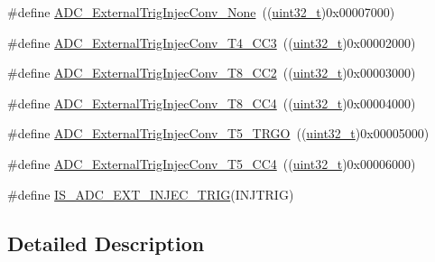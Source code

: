 \begin{DoxyCompactItemize}
\item 
\#define \hyperlink{group___a_d_c__external__trigger__sources__for__injected__channels__conversion_gaad11a68fca76d97b97dc2554dac5cb16}{A\+D\+C\+\_\+\+External\+Trig\+Injec\+Conv\+\_\+\+None}~((\hyperlink{_p_e___types_8h_a33594304e786b158f3fb30289278f5af}{uint32\+\_\+t})0x00007000)
\item 
\#define \hyperlink{group___a_d_c__external__trigger__sources__for__injected__channels__conversion_gae342ca48595f0b2bf866943969026581}{A\+D\+C\+\_\+\+External\+Trig\+Injec\+Conv\+\_\+\+T4\+\_\+\+C\+C3}~((\hyperlink{_p_e___types_8h_a33594304e786b158f3fb30289278f5af}{uint32\+\_\+t})0x00002000)
\item 
\#define \hyperlink{group___a_d_c__external__trigger__sources__for__injected__channels__conversion_gac0320df9aa5e2d378b05f8e4dcc1616a}{A\+D\+C\+\_\+\+External\+Trig\+Injec\+Conv\+\_\+\+T8\+\_\+\+C\+C2}~((\hyperlink{_p_e___types_8h_a33594304e786b158f3fb30289278f5af}{uint32\+\_\+t})0x00003000)
\item 
\#define \hyperlink{group___a_d_c__external__trigger__sources__for__injected__channels__conversion_ga6724679fe75f87c029f268ef47841a3e}{A\+D\+C\+\_\+\+External\+Trig\+Injec\+Conv\+\_\+\+T8\+\_\+\+C\+C4}~((\hyperlink{_p_e___types_8h_a33594304e786b158f3fb30289278f5af}{uint32\+\_\+t})0x00004000)
\item 
\#define \hyperlink{group___a_d_c__external__trigger__sources__for__injected__channels__conversion_ga1d92236e9eb9f3adf69371f3f698192e}{A\+D\+C\+\_\+\+External\+Trig\+Injec\+Conv\+\_\+\+T5\+\_\+\+T\+R\+GO}~((\hyperlink{_p_e___types_8h_a33594304e786b158f3fb30289278f5af}{uint32\+\_\+t})0x00005000)
\item 
\#define \hyperlink{group___a_d_c__external__trigger__sources__for__injected__channels__conversion_gade68a960ba05714e5f0a1f11a086884e}{A\+D\+C\+\_\+\+External\+Trig\+Injec\+Conv\+\_\+\+T5\+\_\+\+C\+C4}~((\hyperlink{_p_e___types_8h_a33594304e786b158f3fb30289278f5af}{uint32\+\_\+t})0x00006000)
\item 
\#define \hyperlink{group___a_d_c__external__trigger__sources__for__injected__channels__conversion_ga3cb8cadbff46e432b5e000c3a7489a0b}{I\+S\+\_\+\+A\+D\+C\+\_\+\+E\+X\+T\+\_\+\+I\+N\+J\+E\+C\+\_\+\+T\+R\+IG}(I\+N\+J\+T\+R\+IG)
\end{DoxyCompactItemize}


\subsection{Detailed Description}


